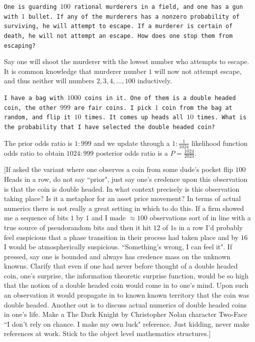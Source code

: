 \texttt{One is guarding $100$ rational murderers in a field, and one has a gun with $1$ bullet. If any of the murderers has a nonzero probability of surviving, he will attempt to escape. If a murderer is certain of death, he will not attempt an escape. How does one stop them from escaping?}

Say one will shoot the murderer with the lowest number who attempts to escape. It is common knowledge that murderer number $1$ will now not attempt escape, and thus neither will numbers $2,3,4,\dots,100$ inductively.

\texttt{I have a bag with $1000$ coins in it. One of them is a double headed coin, the other $999$ are fair coins. I pick $1$ coin from the bag at random, and flip it $10$ times. It comes up heads all $10$ times. What is the probability that I have selected the double headed coin?}

The prior odds ratio is $1:999$ and we update through a $1:\frac{1}{1024}$ likelihood function odds ratio to obtain $1024:999$ posterior odds ratio is a $P=\boxed{\frac{1024}{2023}}$.

[If asked the variant where one observes a coin from some dude's pocket flip $100$ Heads in a row, do not say ``prior", just say one's credence upon this observation is that the coin is double headed. In what context precisely is this observation taking place? Is it a metaphor for an asset price movement? In terms of actual numerics there is not really a great setting in which to do this. If a firm showed me a sequence of bits $1$ by $1$ and I made $\approx 100$ observations sort of in line with a true source of pseudorandom bits and then it hit $12$ of $1$s in a row I'd probably feel suspicious that a phase transition in their process had taken place and by $16$ I would be atmospherically suspicious. ``Something's wrong, I can feel it". If pressed, say one is bounded and always has credence mass on the unknown knowns. Clarify that even if one had never before thought of a double headed coin, one's surprise, the information theoretic surprise function, would be so high that the notion of a double headed coin would come in to one's mind. Upon such an observation it would propagate in to known known territory that the coin was double headed. Another out is to discuss actual numerics of double headed coins in one's life. Make a The Dark Knight by Christopher Nolan character Two-Face ``I don't rely on chance. I make my own luck" reference. Just kidding, never make references at work. Stick to the object level mathematics structures.]

